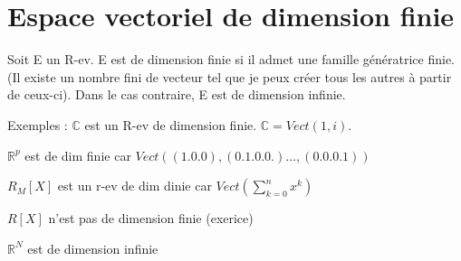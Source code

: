 \documentclass[french]{yLectureNote}
\newcommand{\R}[0]{\mathbb{R}}
\newcommand{\C}[0]{\mathbb{C}}
\begin{document}
\section{Espace vectoriel de dimension finie}
\begin{definition}
Soit E un R-ev. E est de dimension finie si il admet une famille génératrice finie. (Il existe un nombre fini de vecteur tel que je peux créer tous les autres à partir de ceux-ci). Dans le cas contraire, E est de dimension infinie.
\end{definition}
Exemples : $\C$ est un R-ev de dimension finie. $\C = Vect(1,i)$.

$\R^p$ est de dim finie car $Vect((1.0.0),(0.1.0.0.)\dots,(0.0.0.1))$

$R_M[X]$ est un r-ev de dim dinie car $Vect(\sum_{k=0}^n x^k)$

$R[X]$ n'est pas de dimension finie (exerice)

$\R^N$ est de dimension infinie
\end{document}
